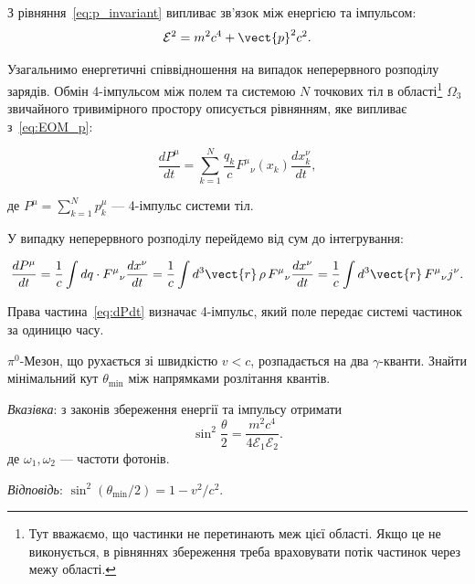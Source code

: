 З рівняння~\eqref{eq:p_invariant} випливає зв'язок між енергією та імпульсом:
\begin{equation*}
    \mathcal{E}^2 = m^2c^4 + \vect{p}^2c^2.
\end{equation*}

Узагальнимо енергетичні співвідношення на випадок неперервного розподілу зарядів. Обмін 4-імпульсом між полем та
системою $N$ точкових тіл в області\footnote{Тут вважаємо, що частинки не перетинають меж цієї області. Якщо це не
виконується, в рівняннях збереження треба враховувати потік частинок через межу області.} $\Omega_3$ звичайного
тривимірного простору описується рівнянням, яке випливає з~\eqref{eq:EOM_p}:

\begin{equation*}
    \frac{dP^{\mu}}{dt} = \sum_{k=1}^{N}\frac{q_k}{c}F^{\mu}{}_{\nu}(x_k)
    \frac{dx_k^{\nu}}{dt},
\end{equation*}

де $P^{\mu}=\sum_{k=1}^{N}p_k^{\mu}$ --- 4-імпульс системи тіл.

У випадку неперервного розподілу перейдемо від сум до інтегрування:

\begin{equation}\label{eq:dPdt}
    \frac{dP^{\mu}}{dt}
    = \frac{1}{c}\int dq\cdot F^{\mu}{}_{\nu}\frac{dx^{\nu}}{dt}
    = \frac{1}{c}\int d^3\vect{r}\,\rho\,F^{\mu}{}_{\nu}\frac{dx^{\nu}}{dt}
    = \frac{1}{c}\int d^3\vect{r}\,F^{\mu}{}_{\nu}j^{\nu}.
\end{equation}

Права частина~\eqref{eq:dPdt} визначає 4-імпульс, який поле передає системі частинок за одиницю часу.

\begin{problem}
    $\pi^0$-Мезон, що рухається зі швидкістю $v<c$, розпадається на два $\gamma$-кванти. Знайти мінімальний кут
    $\theta_{\min}$ між напрямками розлітання квантів.

    \textit{Вказівка}: з законів збереження енергії та імпульсу отримати
    \begin{equation*}
        \sin^2\!\frac{\theta}{2} = \frac{m^2c^4}{4\mathcal{E}_1\mathcal{E}_2}.
    \end{equation*}
    де $\omega_1,\omega_2$ --- частоти фотонів.

    \textit{Відповідь}: $\sin^2(\theta_{\min}/2) = 1 - v^2/c^2$.
\end{problem}

